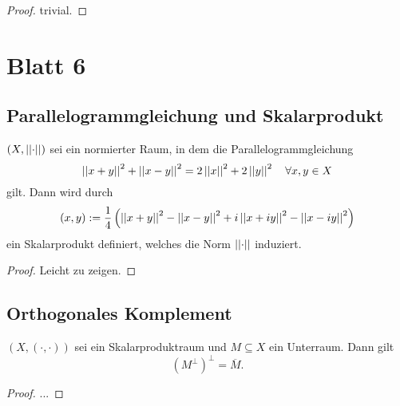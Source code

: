 \documentclass[FunkAnaSkriptSS2017.tex]{subfiles} %
\begin{document}
	\begin{proof}
		trivial.
	\end{proof}
	
	
	
\newpage
\section{Blatt 6}

\subsection{ Parallelogrammgleichung und Skalarprodukt}
	$(X,\left\lvert \left\lvert \cdot \right\rvert \right\rvert)$ sei ein normierter Raum, in dem die Parallelogrammgleichung 
	$$\left\lvert \left\lvert x+y \right\rvert \right\rvert^2 + \left\lvert \left\lvert x-y \right\rvert \right\rvert^2 = 2\left\lvert \left\lvert x \right\rvert \right\rvert^2 + 2\left\lvert \left\lvert y \right\rvert \right\rvert^2\quad \forall x,y \in X$$	
	gilt. Dann wird durch 
	$$(x,y) := \frac{1}{4} \left( \left\lvert \left\lvert x+y \right\rvert \right\rvert^2 - \left\lvert \left\lvert x-y \right\rvert \right\rvert^2 + i\left\lvert \left\lvert x+iy \right\rvert \right\rvert^2 - \left\lvert \left\lvert x-iy \right\rvert \right\rvert^2 \right)$$
	ein Skalarprodukt definiert, welches die Norm $\left\lvert \left\lvert \cdot \right\rvert \right\rvert$ induziert.
	
	\begin{proof}
	Leicht zu zeigen.
	\end{proof}

\subsection{ Orthogonales Komplement}
	$(X,(\cdot, \cdot) )$ sei ein Skalarproduktraum \todoo[ vollständig?!] und $M\subseteq X$ ein Unterraum. Dann gilt
	$$\left( M^{\perp} \right)^{\perp} = \overline{M}.$$ 
	\begin{proof}
	...
	\end{proof}


\end{document}
